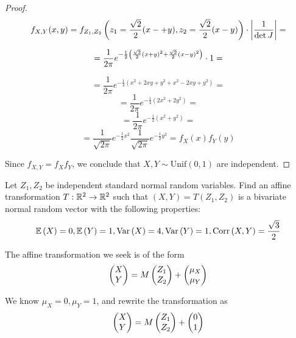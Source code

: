 \documentclass{exam}
\begin{document}
\begin{questions}
\begin{proof}
    
    $$f_{X, Y}(x, y) = f_{Z_1, Z_2}\left( z_1 = \frac{\sqrt{2}}{2}(x -+ y), z_2 = \frac{\sqrt{2}}{2}(x - y) \right)\cdot \left| \frac{1}{\det J} \right| =$$

    $$= \frac{1}{2\pi}e^{-\frac{1}{2}\left( \frac{\sqrt{2}}{2}(x + y)^2 + \frac{\sqrt{2}}{2}(x - y)^2 \right)}\cdot 1 =$$

    $$= \frac{1}{2\pi}e^{-\frac{1}{4}(x^2 + 2xy + y^2 + x^2 - 2xy + y^2)} = $$
    $$= \frac{1}{2\pi}e^{-\frac{1}{4}(2x^2 + 2y^2)} = $$
    $$= \frac{1}{2\pi}e^{-\frac{1}{2}(x^2 + y^2)} =$$
    $$= \frac{1}{\sqrt{2\pi}}e^{-\frac{1}{2}x^2}\frac{1}{\sqrt{2\pi}}e^{-\frac{1}{2}y^2} = f_X(x)f_Y(y)$$

    

    Since $f_{X, Y} = f_Xf_Y$, we conclude that $X, Y\sim\text{Unif}(0, 1)$ are independent.
\end{proof}
\newpage
\question
Let $Z_1, Z_2$ be independent standard normal random variables. Find an affine transformation $T: \mathbb {R}^2 \rightarrow \mathbb {R}^2$ such that $(X, Y) = T(Z_1, Z_2)$ is a bivariate normal random vector with the following properties:
$$\mathbb{E}\left( X \right) = 0, \mathbb{E}\left( Y \right) = 1, \text{Var}\left( X \right) = 4, \text{Var}\left( Y \right) = 1, \text{Corr}\left( X, Y \right) = \frac{\sqrt{3}}{2}$$

\sol
The affine transformation we seek is of the form
$$\left( \begin{matrix}
    X \\ Y \\
\end{matrix} \right) = M\left( \begin{matrix}
    Z_1 \\ Z_2 \\
\end{matrix} \right) + \left( \begin{matrix}
    \mu_X \\ \mu_Y \\
\end{matrix} \right)$$

We know $\mu_X = 0, \mu_Y = 1$, and rewrite the transformation as
$$\left( \begin{matrix}
    X \\ Y \\
\end{matrix} \right) = M\left( \begin{matrix}
    Z_1 \\ Z_2 \\
\end{matrix} \right) + \left( \begin{matrix}
    0 \\ 1 \\
\end{matrix} \right)$$


\end{questions}
\end{document}
